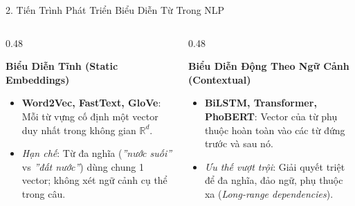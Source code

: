 \documentclass[aspectratio=169, 10pt]{beamer}
\begin{document}
\begin{frame}{2. Tiến Trình Phát Triển Biểu Diễn Từ Trong NLP}
  \vspace{0.35cm}
  \begin{columns}[t]
    \begin{column}{0.48\textwidth}
      \begin{block}{\small\textbf{Biểu Diễn Tĩnh (Static Embeddings)}}
        \fontsize{7.5}{9.5}\selectfont
        \begin{itemize}
          \item \textbf{Word2Vec, FastText, GloVe}: Mỗi từ vựng cố định một vector duy nhất trong không gian $\mathbb{R}^d$.
          \item \textit{Hạn chế}: Từ đa nghĩa (\textit{''nước suối''} vs \textit{''đất nước''}) dùng chung 1 vector; không xét ngữ cảnh cụ thể trong câu.
        \end{itemize}
      \end{block}
    \end{column}
    \begin{column}{0.48\textwidth}
      \begin{block}{\small\textbf{Biểu Diễn Động Theo Ngữ Cảnh (Contextual)}}
        \fontsize{7.5}{9.5}\selectfont
        \begin{itemize}
          \item \textbf{BiLSTM, Transformer, PhoBERT}: Vector của từ phụ thuộc hoàn toàn vào các từ đứng trước và sau nó.
          \item \textit{Ưu thế vượt trội}: Giải quyết triệt để đa nghĩa, đảo ngữ, phụ thuộc xa (\textit{Long-range dependencies}).
        \end{itemize}
      \end{block}
    \end{column}
  \end{columns}
\end{frame}
\end{document}
